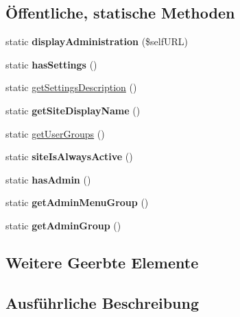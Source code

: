 \subsection*{Öffentliche, statische Methoden}
\begin{DoxyCompactItemize}
\item 
\mbox{\label{classelternsprechtag_af23a75350a38e0548378e4a89971ca05}} 
static {\bfseries display\+Administration} (\$self\+U\+RL)
\item 
\mbox{\label{classelternsprechtag_a1fb305a306087c38ee136c8ff093cdf1}} 
static {\bfseries has\+Settings} ()
\item 
static \mbox{\hyperlink{classelternsprechtag_aaaeb82c52ab2bb136692c19a8381d500}{get\+Settings\+Description}} ()
\item 
\mbox{\label{classelternsprechtag_aa2a2948141c84b0fa7f13cef1f98db1c}} 
static {\bfseries get\+Site\+Display\+Name} ()
\item 
static \mbox{\hyperlink{classelternsprechtag_a0bbf138f7aaeddd953a9959fedf1f624}{get\+User\+Groups}} ()
\item 
\mbox{\label{classelternsprechtag_abc99b4b726b452c6a91499824606c9b7}} 
static {\bfseries site\+Is\+Always\+Active} ()
\item 
\mbox{\label{classelternsprechtag_a0bb4816315021947292e24b9527079a3}} 
static {\bfseries has\+Admin} ()
\item 
\mbox{\label{classelternsprechtag_a33065831325a6e945c1ee9020caadd72}} 
static {\bfseries get\+Admin\+Menu\+Group} ()
\item 
\mbox{\label{classelternsprechtag_a734208af9491899d18a8d403cb50e5dd}} 
static {\bfseries get\+Admin\+Group} ()
\end{DoxyCompactItemize}
\subsection*{Weitere Geerbte Elemente}


\subsection{Ausführliche Beschreibung}


